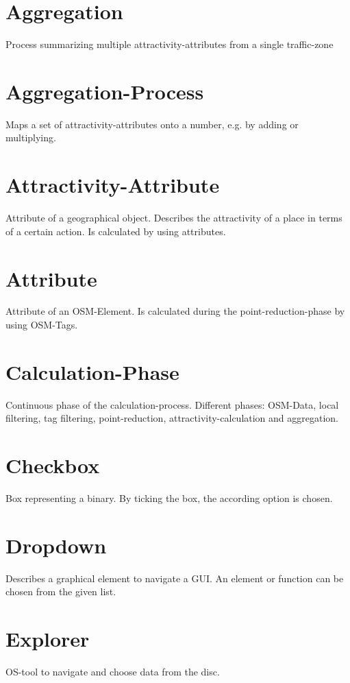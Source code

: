 \documentclass[parskip=full]{report} %
\begin{document}
\section*{Aggregation}
Process summarizing multiple attractivity-attributes from a single traffic-zone

\section*{Aggregation-Process}
Maps a set of attractivity-attributes onto a number, e.g. by adding or multiplying.

\section*{Attractivity-Attribute}
Attribute of a geographical object. Describes the attractivity of a place in terms of a certain action. Is calculated by using attributes.

\section*{Attribute}
Attribute of an OSM-Element. Is calculated during the point-reduction-phase by using OSM-Tags.

\section*{Calculation-Phase}
Continuous phase of the calculation-process. Different phases: OSM-Data, local filtering, tag filtering, point-reduction, attractivity-calculation and aggregation.

\section*{Checkbox}
Box representing a binary. By ticking the box, the according option is chosen.

\section*{Dropdown}
Describes a graphical element to navigate a GUI. An element or function can be chosen from the given list.

\section*{Explorer}
OS-tool to navigate and choose data from the disc.
\end{document}
